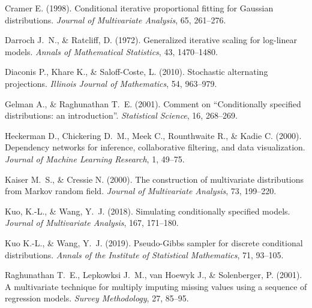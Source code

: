 \documentclass[12pt,a4paper]{article}
\begin{document}
\begin{thebibliography}{40}
Cramer E. (1998).
Conditional iterative proportional fitting for Gaussian distributions.
\emph{Journal of Multivariate Analysis}, 65, 261--276.

Darroch J.~N., \& Ratcliff, D. (1972).
Generalized iterative scaling for log-linear models.
\emph{Annals of Mathematical Statistics}, 43, 1470--1480.

Diaconis P., Khare K., \& Saloff-Coste, L. (2010).
Stochastic alternating projections.
\emph{Illinois Journal of Mathematics}, 54, 963--979.

Gelman A., \& Raghunathan T.~E. (2001).
Comment on ``Conditionally specified distributions: an introduction''.
\emph{Statistical Science}, 16, 268--269.


Heckerman D., Chickering D.~M., Meek C., Rounthwaite R., \& Kadie C. (2000).
Dependency networks for inference, collaborative filtering, and data visualization.
\emph{Journal of Machine Learning Research}, 1, 49--75.

Kaiser M.~S., \& Cressie N. (2000).
The construction of multivariate distributions from Markov random field.
\emph{Journal of Multivariate Analysis}, 73, 199--220.

Kuo, K.-L., \& Wang, Y.~J. (2018).
Simulating conditionally specified models.
\emph{Journal of Multivariate Analysis}, 167, 171--180.

Kuo K.-L., \& Wang, Y.~J. (2019).
Pseudo-Gibbs sampler for discrete conditional distributions.
\emph{Annals of the Institute of Statistical Mathematics}, 71, 93--105.

Raghunathan T.~E., Lepkowksi J.~M., van Hoewyk J., \& Solenberger, P. (2001).
A multivariate technique for multiply imputing missing values using a sequence of regression models.
\emph{Survey Methodology}, 27, 85--95.



\end{thebibliography}
\end{document}
